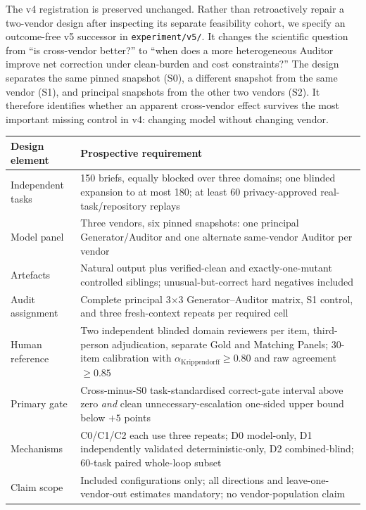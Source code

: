 \documentclass[11pt]{article}
\begin{document}
The v4 registration is preserved unchanged. Rather than retroactively repair a two-vendor design after inspecting its separate feasibility cohort, we specify an outcome-free v5 successor in \texttt{experiment/v5/}. It changes the scientific question from ``is cross-vendor better?'' to ``when does a more heterogeneous Auditor improve net correction under clean-burden and cost constraints?'' The design separates the same pinned snapshot (S0), a different snapshot from the same vendor (S1), and principal snapshots from the other two vendors (S2). It therefore identifies whether an apparent cross-vendor effect survives the most important missing control in v4: changing model without changing vendor.

\begin{center}
\footnotesize\setlength{\tabcolsep}{3pt}\renewcommand{\arraystretch}{0.96}
\label{tab:v5design}
\begin{tabular}{@{}p{37mm}p{105mm}@{}}
\toprule
Design element & Prospective requirement \\
\midrule
Independent tasks & 150 briefs, equally blocked over three domains; one blinded expansion to at most 180; at least 60 privacy-approved real-task/repository replays \\
Model panel & Three vendors, six pinned snapshots: one principal Generator/Auditor and one alternate same-vendor Auditor per vendor \\
Artefacts & Natural output plus verified-clean and exactly-one-mutant controlled siblings; unusual-but-correct hard negatives included \\
Audit assignment & Complete principal 3$\times$3 Generator--Auditor matrix, S1 control, and three fresh-context repeats per required cell \\
Human reference & Two independent blinded domain reviewers per item, third-person adjudication, separate Gold and Matching Panels; 30-item calibration with $\alpha_{\mathrm{Krippendorff}}\geq0.80$ and raw agreement $\geq0.85$ \\
Primary gate & Cross-minus-S0 task-standardised correct-gate interval above zero \emph{and} clean unnecessary-escalation one-sided upper bound below $+5$ points \\
Mechanisms & C0/C1/C2 each use three repeats; D0 model-only, D1 independently validated deterministic-only, D2 combined-blind; 60-task paired whole-loop subset \\
Claim scope & Included configurations only; all directions and leave-one-vendor-out estimates mandatory; no vendor-population claim \\
\bottomrule
\end{tabular}
\end{center}
\end{document}
